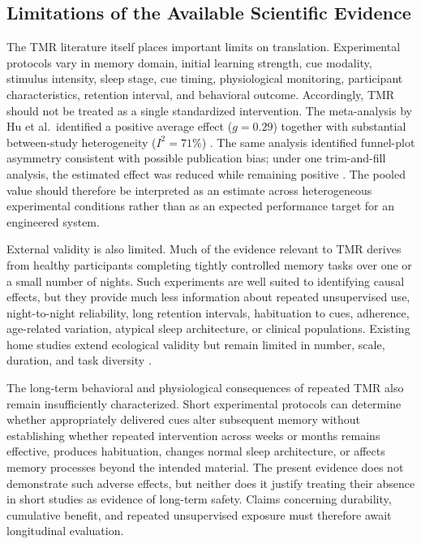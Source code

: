 \subsection{Limitations of the Available Scientific Evidence}

The TMR literature itself places important limits on translation. Experimental
protocols vary in memory domain, initial learning strength, cue modality,
stimulus intensity, sleep stage, cue timing, physiological monitoring,
participant characteristics, retention interval, and behavioral outcome.
Accordingly, TMR should not be treated as a single standardized intervention.
The meta-analysis by Hu et al.\ identified a positive average effect
(\(g=0.29\)) together with substantial between-study heterogeneity
(\(I^2=71\%\)) \citep{hu2020promoting}. The same analysis identified funnel-plot
asymmetry consistent with possible publication bias; under one trim-and-fill
analysis, the estimated effect was reduced while remaining positive
\citep{hu2020promoting}. The pooled value should therefore be interpreted as an
estimate across heterogeneous experimental conditions rather than as an
expected performance target for an engineered system.

External validity is also limited. Much of the evidence relevant to TMR derives
from healthy participants completing tightly controlled memory tasks over one
or a small number of nights. Such experiments are well suited to identifying
causal effects, but they provide much less information about repeated
unsupervised use, night-to-night reliability, long retention intervals,
habituation to cues, adherence, age-related variation, atypical sleep
architecture, or clinical populations. Existing home studies extend ecological
validity but remain limited in number, scale, duration, and task diversity
\citep{goldi2019home,whitmore2022improving,salfi2025promoting}.

The long-term behavioral and physiological consequences of repeated TMR also
remain insufficiently characterized. Short experimental protocols can determine
whether appropriately delivered cues alter subsequent memory without
establishing whether repeated intervention across weeks or months remains
effective, produces habituation, changes normal sleep architecture, or affects
memory processes beyond the intended material. The present evidence does not
demonstrate such adverse effects, but neither does it justify treating their
absence in short studies as evidence of long-term safety. Claims concerning
durability, cumulative benefit, and repeated unsupervised exposure must
therefore await longitudinal evaluation.

